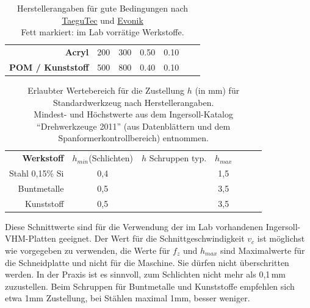 \documentclass{\basedir/fablab-document}
\begin{document}
\begin{table}
\begin{tabular}{rcccccc}
	\textbf{Acryl}				   & 200	& 300 	& 0.50 	& 0.10\\
	\textbf{POM / Kunststoff}			   & 500	& 800 	& 0.40 	& 0.10\\
\end{tabular}
\caption{Herstellerangaben für gute Bedingungen nach \href{http://www.taegutec.com/Ustyles/DownloadFiles/I_Grades_en.pdf}{TaeguTec} und \href{http://www.roehmschweiz.ch/fileadmin/Roehm/PDF_Plexiglas/311-1_Bearbeiten_von_PLEXIGLAS_de.pdf}{Evonik} \\Fett markiert: im Lab vorrätige Werkstoffe.}
\end{table}

\begin{table}
\centering
\setlength{\tabcolsep}{0.5em}

\begin{tabular}{rcccccc}
  \textbf{Werkstoff} & $h_{min}$(Schlichten) & $h$ Schruppen typ. & $h_{max}$ \\
  Stahl 0,15\% Si       & 0,4 & & 1,5\\
  Buntmetalle           & 0,5 & & 3,5\\
  Kunststoff            & 0,5 & & 3,5\\
\end{tabular}
\caption{Erlaubter Wertebereich für die Zustellung $h$ (in mm) für Standardwerkzeug nach Herstellerangaben. \\Mindest- und Höchstwerte aus dem Ingersoll-Katalog \enquote{Drehwerkzeuge 2011} (aus Datenblättern und dem Spanformerkontrollbereich) entnommen.}
\end{table} 

Diese Schnittwerte sind für die Verwendung der im Lab vorhandenen Ingersoll-VHM-Platten geeignet. Der Wert für die Schnittgeschwindigkeit $v_c$ ist möglichst wie vorgegeben zu verwenden, die Werte für $f_z$ und $h_{max}$ sind Maximalwerte für die Schneidplatte und nicht für die Maschine. Sie dürfen nicht überschritten werden. In der Praxis ist es sinnvoll, zum Schlichten nicht mehr als 0,1\,mm zuzustellen. Beim Schruppen für Buntmetalle und Kunststoffe empfehlen sich etwa 1mm Zustellung, bei Stählen maximal 1mm, besser weniger.\\
\end{document}

